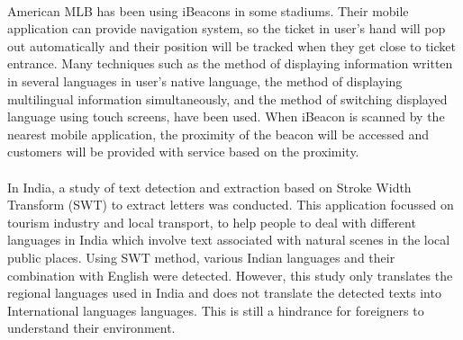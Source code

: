 \documentclass[12pt]{article}
\begin{document}
\paragraph{}American MLB has been using iBeacons in some stadiums. Their mobile application can provide navigation system, so the ticket in user's hand will pop out automatically and their position will be tracked when they get close to ticket entrance. Many techniques such as the method of displaying information written in several languages in user's native language, the method of displaying multilingual information simultaneously, and the method of switching displayed language using touch screens, have been used. \cite{zoo} When iBeacon is scanned by the nearest mobile application, the proximity of the beacon will be accessed and customers will be provided with service based on the proximity.\cite{taiwan} \cite{room}

\paragraph{}In India, a study of text detection and extraction based on Stroke Width Transform (SWT) to extract letters was conducted. \cite{india} This application focussed on tourism industry and local transport, to help people to deal with different languages in India which involve text associated with natural scenes in the local public places. Using SWT method, various Indian languages and their combination with English were detected. However, this study only translates the regional languages used in India and does not translate the detected texts into International languages languages. This is still a hindrance for foreigners to understand their environment.
\end{document}
